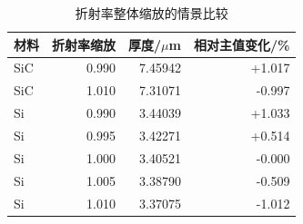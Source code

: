 \begin{table}[htbp]\centering
\caption{折射率整体缩放的情景比较}\label{tab:index-sensitivity}
\begin{tabular}{lrrr}
\toprule
材料 & 折射率缩放 & 厚度/$\mu$m & 相对主值变化/\%\\\midrule
SiC & 0.990 & 7.45942 & +1.017\\
SiC & 1.010 & 7.31071 & -0.997\\
Si & 0.990 & 3.44039 & +1.033\\
Si & 0.995 & 3.42271 & +0.514\\
Si & 1.000 & 3.40521 & -0.000\\
Si & 1.005 & 3.38790 & -0.509\\
Si & 1.010 & 3.37075 & -1.012\\
\bottomrule
\end{tabular}\end{table}
